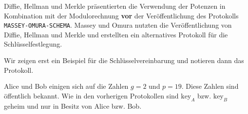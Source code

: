 \begin{hinweis}
	Diffie, Hellman und Merkle präsentierten die Verwendung der Potenzen in Kombination mit der Modulorechnung \textbf{vor} der Veröffentlichung des Protokolls \texttt{MASSEY-OMURA-SCHEMA}. Massey und Omura nutzten die Veröffentlichung von Diffie, Hellman und Merkle und erstellten ein alternatives Protokoll für die Schlüsselfestlegung.
\end{hinweis}

Wir zeigen erst ein Beispiel für die Schlüsselvereinbarung und notieren dann das Protokoll.

\begin{example}

Alice und Bob einigen sich auf die Zahlen $g = 2$ und $p = 19$. Diese Zahlen sind öffentlich bekannt. Wie in den vorherigen Protokollen sind $\text{key}_A$ bzw. $\text{key}_B$ geheim und nur in Besitz von Alice bzw. Bob.

\begin{figure}[htb]
\end{figure}
\end{example}
